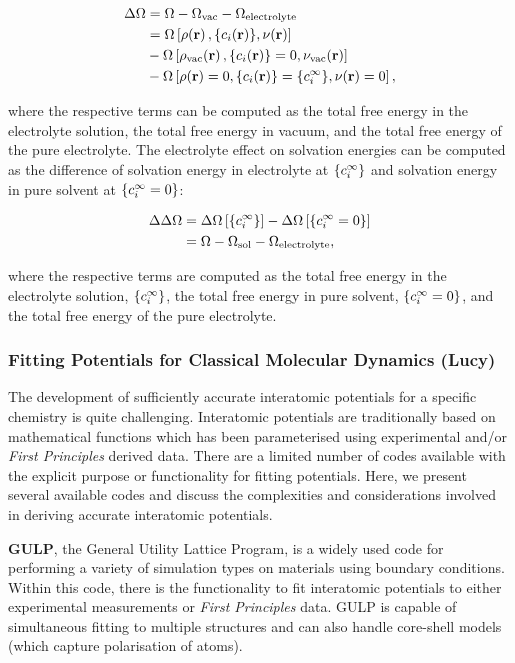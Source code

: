 \documentclass[../main.tex]{subfiles}
\begin{document}
\begin{align}
    \Delta\Omega &=\Omega-\Omega_{\textrm{vac}}-\Omega_{\textrm{electrolyte}} \\
    &=\Omega\left[\rho\ofrvec,\{\ci\ofrvec\},\nu\ofrvec\right] \\
    \nonumber
    &-\Omega\left[\rho_{\textrm{vac}}\ofrvec,\{\ci\ofrvec\}=0,\nu_{\textrm{vac}}\ofrvec\right] \\
    \nonumber
    &-\Omega\left[\rho\ofrvec=0,\{\ci\ofrvec\}=\{\cif\},\nu\ofrvec=0\right]
    \nonumber,
\end{align}

where the respective terms can be computed as the total free energy in the electrolyte solution, the total free energy in vacuum, and the total free energy of the pure electrolyte.\cite{Dziedzic2020} The electrolyte effect on solvation energies can be computed as the difference of solvation energy in electrolyte at $\{c_i^{\infty}\}$ and solvation energy in pure solvent at $\{c_i^{\infty}=0\}$:

\begin{align}
    \Delta\Delta\Omega    &= \Delta\Omega\left[{\{c_i^{\infty}\}}\right]-\Delta\Omega\left[{\{c_i^{\infty}=0\}}\right] \\
    &= \Omega - \Omega_{\textrm{sol}} - \Omega_{\textrm{electrolyte}},
\end{align}

where the respective terms are computed as the total free energy in the electrolyte solution, $\{c_i^{\infty}\}$, the total free energy in pure solvent, $\{c_i^{\infty}=0\}$, and the total free energy of the pure electrolyte. 


\subsubsection{Fitting Potentials for Classical Molecular Dynamics (Lucy)}
\label{sec:potential_fitting}
The development of sufficiently accurate interatomic potentials for a specific chemistry is quite challenging. Interatomic potentials are traditionally based on mathematical functions which has been parameterised using experimental and/or \textit{First Principles} derived data. \cite{jones_1924, buckingham_classical_1938} There are a limited number of codes available with the explicit purpose or functionality for fitting potentials. Here, we present several available codes and discuss the complexities and considerations involved in deriving accurate interatomic potentials.

\textbf{GULP}, \cite{GULP} the General Utility Lattice Program, is a widely used code for performing a variety of simulation types on materials using boundary conditions. \cite{gale_gulp_1997} Within this code, there is the functionality to fit interatomic potentials to either experimental measurements or \textit{First Principles} data.\cite{gale_empirical_1996} GULP is capable of simultaneous fitting to multiple structures and can also handle core-shell models (which capture polarisation of atoms).
\end{document}
